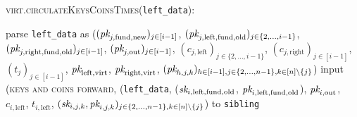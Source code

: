 \begin{center}
  \begin{processbox}{\textsc{virt}.\textsc{circulateKeysCoinsTimes}(\texttt{left\_data}):}
    \begin{algorithmic}[1]
       
        \State parse \texttt{left\_data} as ($(\textit{pk}_{j, \mathrm{fund},
        \mathrm{new}})_{j \in [i-1]}$, $(\textit{pk}_{j, \mathrm{left}, \mathrm{fund},
        \mathrm{old}})_{j \in \{2, \dots, i-1\}}$, $(\textit{pk}_{j, \mathrm{right},
        \mathrm{fund}, \mathrm{old}})_{j \in [i-1]}$, $(\textit{pk}_{j, \mathrm{out}})_{j
        \in [i-1]}$, $(c_{j, \mathrm{left}})_{j \in \{2, \dots, i-1\}}$, $(c_{j,
        \mathrm{right}})_{j \in [i-1]}$, $(t_j)_{j \in [i-1]}$,
        $\textit{pk}_{\mathrm{left}, \mathrm{virt}}$, $\textit{pk}_{\mathrm{right},
        \mathrm{virt}}$, $(\textit{pk}_{h, j, k})_{h \in [i-1], j \in \{2, \dots, n-1\},
        k \in [n] \setminus \{j\}}$)
         
          \State input (\textsc{keys and coins forward}, (\texttt{left\_data},
          ($\textit{sk}_{i, \mathrm{left}, \mathrm{fund}, \mathrm{old}}$, $\textit{pk}_{i,
          \mathrm{left}, \mathrm{fund}, \mathrm{old}}$), $\textit{pk}_{i, \mathrm{out}}$,
          $c_{i, \mathrm{left}}$, $t_{i, \mathrm{left}}$, $(\textit{sk}_{i, j, k}, \textit{pk}_{i,
          j, k})_{j \in \{2, \dots, n-1\}, k \in [n] \setminus \{j\}}$) to
          \texttt{sibling}
          \State {}
          \State {}
          \State {}
          \State {}
\end{algorithmic}
\end{processbox}
\end{center}
